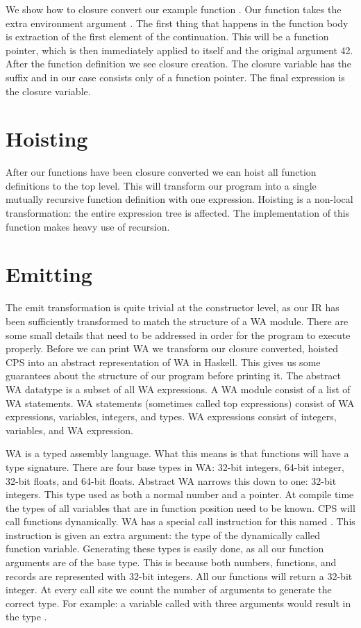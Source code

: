 We show how to closure convert our example function . Our function  takes the extra environment argument . The first thing that happens in the function body is extraction of the first element of the continuation. This will be a function pointer, which is then immediately applied to itself and the original argument 42. After the function definition we see closure creation. The closure variable has the  suffix and in our case consists only of a function pointer. The final expression is the closure variable.

\section{\label{section:hoist}Hoisting}
After our functions have been closure converted we can hoist all function definitions to the top level. This will transform our program into a single mutually recursive function definition with one expression. Hoisting is a non-local transformation: the entire expression tree is affected. The implementation of this function makes heavy use of recursion.

\section{\label{section:emit}Emitting}
The emit transformation is quite trivial at the constructor level, as our \ac{IR} has been sufficiently transformed to match the structure of a \ac{WA} module. There are some small details that need to be addressed in order for the program to execute properly. Before we can print \ac{WA} we transform our closure converted, hoisted \ac{CPS} into an abstract representation of \ac{WA} in Haskell. This gives us some guarantees about the structure of our program before printing it. The abstract \ac{WA} datatype is a subset of all \ac{WA} expressions. A \ac{WA} module consist of a list of \ac{WA} statements. \ac{WA} statements (sometimes called top expressions) consist of \ac{WA} expressions, variables, integers, and types. \ac{WA} expressions consist of integers, variables, and \ac{WA} expression.

\ac{WA} is a typed assembly language. What this means is that functions will have a type signature. There are four base types in \ac{WA}: 32-bit integers, 64-bit integer, 32-bit floats, and 64-bit floats. Abstract \ac{WA} narrows this down to one: 32-bit integers. This type used as both a normal number and a pointer. At compile time the types of all variables that are in function position need to be known. \ac{CPS} will call functions dynamically. \ac{WA} has a special call instruction for this named . This instruction is given an extra argument: the type of the dynamically called function variable. Generating these types is easily done, as all our function arguments are of the base type. This is because both numbers, functions, and records are represented with 32-bit integers. All our functions will return a 32-bit integer. At every call site we count the number of arguments to generate the correct type. For example: a variable  called with three arguments would result in the type .

